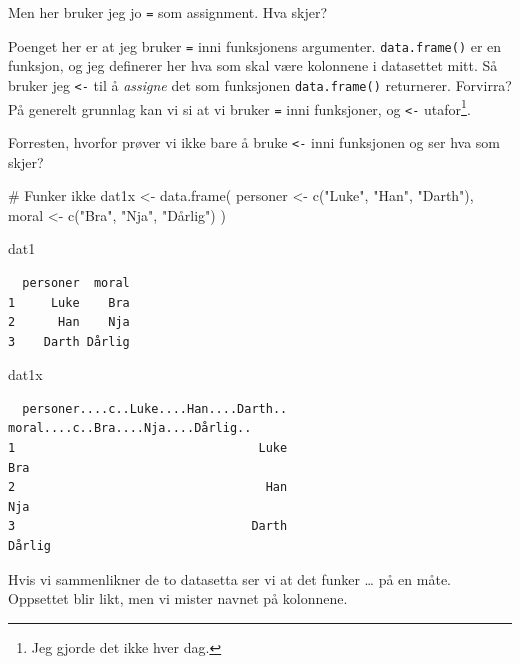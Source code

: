 \documentclass[
  letterpaper,
  DIV=11,
  numbers=noendperiod]{scrreprt}
\newenvironment{Shaded}{\begin{snugshade}}{\end{snugshade}}
\newcommand{\CommentTok}[1]{\textcolor[rgb]{0.37,0.37,0.37}{#1}}
\newcommand{\FunctionTok}[1]{\textcolor[rgb]{0.28,0.35,0.67}{#1}}
\newcommand{\NormalTok}[1]{\textcolor[rgb]{0.00,0.23,0.31}{#1}}
\newcommand{\OtherTok}[1]{\textcolor[rgb]{0.00,0.23,0.31}{#1}}
\newcommand{\StringTok}[1]{\textcolor[rgb]{0.13,0.47,0.30}{#1}}
\begin{document}
Men her bruker jeg jo \texttt{=} som assignment. Hva skjer?

Poenget her er at jeg bruker \texttt{=} inni funksjonens argumenter.
\texttt{data.frame()} er en funksjon, og jeg definerer her hva som skal
være kolonnene i datasettet mitt. Så bruker jeg \texttt{\textless{}-}
til å \emph{assigne} det som funksjonen \texttt{data.frame()}
returnerer. Forvirra? På generelt grunnlag kan vi si at vi bruker
\texttt{=} inni funksjoner, og \texttt{\textless{}-} utafor\footnote{Jeg
  gjorde det ikke hver dag.}.

Forresten, hvorfor prøver vi ikke bare å bruke \texttt{\textless{}-}
inni funksjonen og ser hva som skjer?

\begin{Shaded}
\begin{Highlighting}[]
\CommentTok{\# Funker ikke}
\NormalTok{dat1x }\OtherTok{\textless{}{-}} \FunctionTok{data.frame}\NormalTok{(}
\NormalTok{  personer }\OtherTok{\textless{}{-}} \FunctionTok{c}\NormalTok{(}\StringTok{"Luke"}\NormalTok{, }\StringTok{"Han"}\NormalTok{, }\StringTok{"Darth"}\NormalTok{),}
\NormalTok{  moral }\OtherTok{\textless{}{-}} \FunctionTok{c}\NormalTok{(}\StringTok{"Bra"}\NormalTok{, }\StringTok{"Nja"}\NormalTok{, }\StringTok{"Dårlig"}\NormalTok{)}
\NormalTok{)}

\NormalTok{dat1}
\end{Highlighting}
\end{Shaded}

\begin{verbatim}
  personer  moral
1     Luke    Bra
2      Han    Nja
3    Darth Dårlig
\end{verbatim}

\begin{Shaded}
\begin{Highlighting}[]
\NormalTok{dat1x}
\end{Highlighting}
\end{Shaded}

\begin{verbatim}
  personer....c..Luke....Han....Darth.. moral....c..Bra....Nja....Dårlig..
1                                  Luke                                Bra
2                                   Han                                Nja
3                                 Darth                             Dårlig
\end{verbatim}

Hvis vi sammenlikner de to datasetta ser vi at det funker \ldots{} på en
måte. Oppsettet blir likt, men vi mister navnet på kolonnene.
\end{document}
